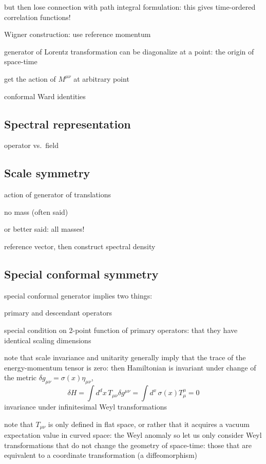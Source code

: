 \documentclass[a4paper,12pt]{article}
\numberwithin{equation}{section}
\begin{document}
but then lose connection with path integral formulation: this gives time-ordered correlation functions!




Wigner construction: use reference momentum


generator of Lorentz transformation can be diagonalize at a point: the origin of space-time

get the action of $M^{\mu\nu}$ at arbitrary point



conformal Ward identities



\subsection{Spectral representation}

operator vs.~field

\subsection{Scale symmetry}

action of generator of translations

no mass (often said)

or better said: all masses!

reference vector, then construct spectral density


\subsection{Special conformal symmetry}

special conformal generator implies two things:

primary and descendant operators

special condition on 2-point function of primary operators: that they have identical scaling dimensions



note that scale invariance and unitarity generally imply that the trace of the energy-momentum tensor is zero: then Hamiltonian is invariant under change of the metric $\delta g_{\mu\nu} = \sigma(x) \eta_{\mu\nu}$,
\begin{equation}
	\delta H = \int d^dx \, T_{\mu\nu} \delta g^{\mu\nu}
	= \int d^x \, \sigma(x) T^\mu_\mu = 0
\end{equation}
invariance under infinitesimal Weyl transformations 

note that $T_{\mu\nu}$ is only defined in flat space, or rather that it acquires a vacuum expectation value in curved space: the Weyl anomaly
so let us only consider Weyl transformations that do not change the geometry of space-time: those that are equivalent to a coordinate transformation (a diffeomorphism)
\end{document}
